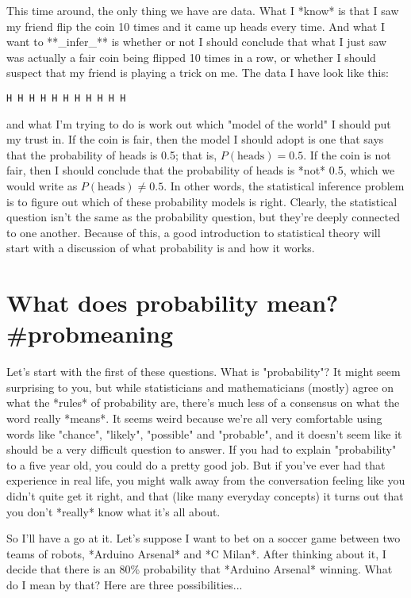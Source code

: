 This time around, the only thing we have are data. What I *know* is that I saw my friend flip the coin 10 times and it came up heads every time. And what I want to **_infer_** is whether or not I should conclude that what I just saw was actually a fair coin being flipped 10 times in a row, or whether I should suspect that my friend is playing a trick on me. The data I have look like this:
\begin{verbatim}
H H H H H H H H H H H
\end{verbatim}
and what I'm trying to do is work out which "model of the world" I should put my trust in. If the coin is fair, then the model I should adopt is one that says that the probability of heads is 0.5; that is, $P(\mbox{heads}) = 0.5$. If the coin is not fair, then I should conclude that the probability of heads is *not* 0.5, which we would write as $P(\mbox{heads}) \neq 0.5$. In other words, the statistical inference problem is to figure out which of these probability models is right. Clearly, the statistical question isn't the same as the probability question, but they're deeply connected to one another. Because of this, a good introduction to statistical theory will start with a discussion of what probability is and how it works.

 

\section{What does probability mean?{#probmeaning}}

Let's start with the first of these questions. What is "probability"? It might seem surprising to you, but while statisticians and mathematicians (mostly) agree on what the *rules* of probability are, there's much less of a consensus on what the word really *means*. It seems weird because we're all very comfortable using words like "chance", "likely", "possible" and "probable", and it doesn't seem like it should be a very difficult question to answer. If you had to explain "probability" to a five year old, you could do a pretty good job. But if you've ever had that experience in real life, you might walk away from the conversation feeling like you didn't quite get it right, and that (like many everyday concepts) it turns out that you don't *really* know what it's all about. 

So I'll have a go at it. Let's suppose I want to bet on a soccer game between two teams of robots, *Arduino Arsenal* and *C Milan*. After thinking about it, I decide that there is an 80\% probability that *Arduino Arsenal* winning. What do I mean by that? Here are three possibilities...

